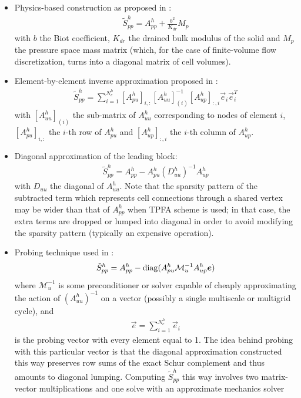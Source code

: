 \begin{itemize}
    \item Physics-based construction as proposed in \cite{White2015}:
    \begin{align}
        \tilde{S}_{pp}^h = A_{pp}^h + \frac{b^2}{K_{dr}}M_p
    \end{align}
    with $b$ the Biot coefficient, $K_{dr}$ the drained bulk modulus of the solid and $M_p$ the pressure space mass matrix (which, for the case of finite-volume flow discretization, turns into a diagonal matrix of cell volumes).
    \item Element-by-element inverse approximation proposed in \cite{Castelletto2016}:
    \begin{align}
        \tilde{S}_{pp}^h = \sum\limits_{i=1}^{N_c^h} [A_{pu}^h]_{i,:} [A_{uu}^h]_{(i)}^{-1} [A_{up}^h]_{:,i} \vec{e}_i \vec{e}_i^T
    \end{align}
    with $[A_{uu}^h]_{(i)}$ the sub-matrix of $A_{uu}^h$ corresponding to nodes of element $i$, $[A_{pu}^h]_{i,:}$ the $i$-th row of $A_{pu}^h$ and $[A_{up}^h]_{:,i}$ the $i$-th column of $A_{up}^h$.
    \item Diagonal approximation of the leading block:
    \begin{align}
        \tilde{S}_{pp}^h = A_{pp}^h - A_{pu}^h (D_{uu}^h)^{-1} A_{up}^h
    \end{align}
    with $D_{uu}$ the diagonal of $A_{uu}^h$.   Note that the sparsity pattern of the subtracted term which represents cell connections through a shared vertex may be wider than that of $A_{pp}^h$ when TPFA scheme is used; in that case, the extra terms are dropped or lumped into diagonal in order to avoid modifying the sparsity pattern (typically an expensive operation).
    \item Probing technique used in \cite{Klevtsov2016}:
    \begin{align}
        \tilde{S}_{pp}^h = A_{pp}^h - \operatorname{diag}(A_{pu}^h \mathcal{M}_u^{-1} A_{up}^h \bm{e})
    \end{align}
    where $\mathcal{M}_u^{-1}$ is some preconditioner or solver capable of cheaply approximating the action of $(A_{uu}^h)^{-1}$ on a vector (possibly a single multiscale or multigrid cycle), and
    \begin{align}
        \vec{e} = \sum\limits_{i=1}^{N_c^h}\vec{e}_i
    \end{align}
    is the probing vector with every element equal to 1.   The idea behind probing with this particular vector is that the diagonal approximation constructed this way preserves row sums of the exact Schur complement and thus amounts to diagonal lumping.   Computing $\tilde{S}_{pp}^h$ this way involves two matrix-vector multiplications and one solve with an approximate mechanics solver
\end{itemize}
